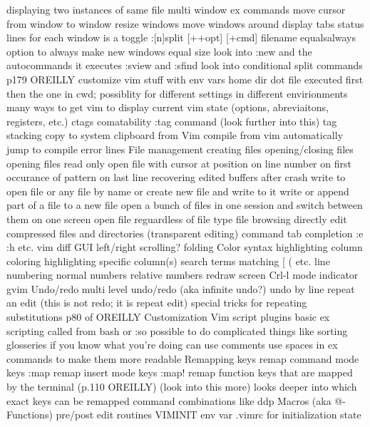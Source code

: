 \documentclass[12pt]{book}
\begin{document}
{      displaying two instances of same file
      multi window ex commands
      move cursor from window to window
      resize windows
      move windows around display
      tabs
      status lines for each window is a toggle
      :[n]split [++opt] [+cmd] filename
      equalsalways option to always make new windows equal size
      look into :new and the autocommands it executes
      :sview and :sfind
      look into conditional split commands p179 OREILLY
    customize vim stuff with env vars 
  home dir dot file executed first then the one in cwd; possiblity for different settings in different envirionments
  many ways to get vim to display current vim state (options, abreviaitons, registers, etc.)
  ctags comatability
    :tag command (look further into this)
    tag stacking
  copy to system clipboard from Vim
  compile from vim
  automatically jump to compile error lines
  File management
    creating files
    opening/closing files
    opening files read only
    open file with cursor at position
      on line number
      on first occurance of pattern
      on last line
    recovering edited buffers after crash
    write to open file or any file by name or create new file and write to it
    write or append part of a file to a new file
    open a bunch of files in one session and switch between them on one screen
    open file reguardless of file type
    file browsing
    directly edit compressed files and directories (transparent editing)
  command tab completion :e :h etc.
  vim diff
GUI
  left/right scrolling?
  folding
  Color
    syntax highlighting
    column coloring
  highlighting
    specific column(s)
    search terms
    matching { [ ( etc.
  line numbering
    normal numbers
    relative numbers
  redraw screen Crl-l
  mode indicator
  gvim 
Undo/redo
  multi level undo/redo (aka infinite undo?)
  undo by line
  repeat an edit (this is not redo; it is repeat edit)
  special tricks for repeating substitutions p80 of OREILLY
Customization
  Vim script
    plugins
    basic ex scripting called from bash or :so
      possible to do complicated things like sorting glosseries if you know what you're doing
      can use comments 
      use spaces in ex commands to make them more readable
  Remapping keys
    remap command mode keys :map
    remap insert mode keys :map!
    remap function keys that are mapped by the terminal (p.110 OREILLY) (look into this more)
    looks deeper into which exact keys can be remapped
  command combinations like ddp
  Macros (aka @-Functions)
  pre/post edit routines
    VIMINIT env var
    .vimrc for initialization state
}}
\end{document}
